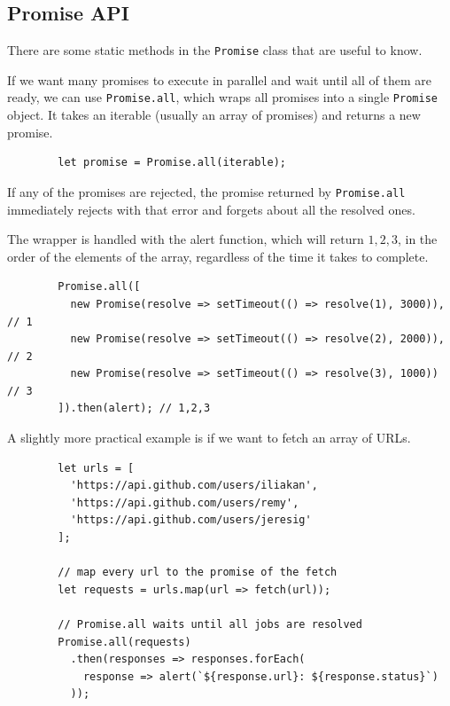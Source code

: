 \documentclass{article}
\begin{document}
  \subsection{Promise API}

    There are some static methods in the \texttt{Promise} class that are useful to know. 

    \begin{definition}
      If we want many promises to execute in parallel and wait until all of them are ready, we can use \texttt{Promise.all}, which wraps all promises into a single \texttt{Promise} object. It takes an iterable (usually an array of promises) and returns a new promise. 
      
      \begin{lstlisting}
        let promise = Promise.all(iterable); 
      \end{lstlisting}

      If any of the promises are rejected, the promise returned by \texttt{Promise.all} immediately rejects with that error and forgets about all the resolved ones. 
    \end{definition}

    \begin{example}
      The wrapper is handled with the alert function, which will return $1, 2, 3$, in the order of the elements of the array, regardless of the time it takes to complete. 
      
      \begin{lstlisting}
        Promise.all([
          new Promise(resolve => setTimeout(() => resolve(1), 3000)), // 1
          new Promise(resolve => setTimeout(() => resolve(2), 2000)), // 2
          new Promise(resolve => setTimeout(() => resolve(3), 1000))  // 3
        ]).then(alert); // 1,2,3  
      \end{lstlisting}

      A slightly more practical example is if we want to fetch an array of URLs. 

      \begin{lstlisting}
        let urls = [
          'https://api.github.com/users/iliakan',
          'https://api.github.com/users/remy',
          'https://api.github.com/users/jeresig'
        ];

        // map every url to the promise of the fetch
        let requests = urls.map(url => fetch(url));

        // Promise.all waits until all jobs are resolved
        Promise.all(requests)
          .then(responses => responses.forEach(
            response => alert(`${response.url}: ${response.status}`)
          )); 
      \end{lstlisting}
    \end{example}
\end{document}
